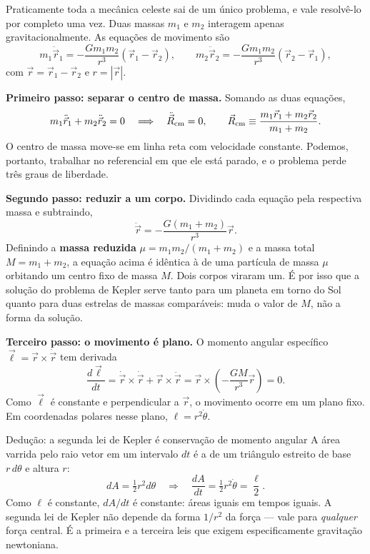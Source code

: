 \documentclass[11pt,a4paper]{article}
\begin{document}
Praticamente toda a mecânica celeste sai de um único problema, e vale resolvê-lo por completo uma vez. Duas massas $m_1$ e $m_2$ interagem apenas gravitacionalmente. As equações de movimento são
\[
m_1\ddot{\vec{r}}_1=-\frac{Gm_1m_2}{r^{3}}(\vec{r}_1-\vec{r}_2),
\qquad
m_2\ddot{\vec{r}}_2=-\frac{Gm_1m_2}{r^{3}}(\vec{r}_2-\vec{r}_1),
\]
com $\vec{r}=\vec{r}_1-\vec{r}_2$ e $r=|\vec{r}|$.

\textbf{Primeiro passo: separar o centro de massa.} Somando as duas equações,
\[
m_1\ddot{\vec{r}}_1+m_2\ddot{\vec{r}}_2=0
\quad\Longrightarrow\quad
\ddot{\vec{R}}_{\rm cm}=0,
\qquad
\vec{R}_{\rm cm}\equiv\frac{m_1\vec{r}_1+m_2\vec{r}_2}{m_1+m_2}.
\]
O centro de massa move-se em linha reta com velocidade constante. Podemos, portanto, trabalhar no referencial em que ele está parado, e o problema perde três graus de liberdade.

\textbf{Segundo passo: reduzir a um corpo.} Dividindo cada equação pela respectiva massa e subtraindo,
\[
\ddot{\vec{r}}=-\frac{G(m_1+m_2)}{r^{3}}\vec{r}.
\]
Definindo a \textbf{massa reduzida} $\mu=m_1m_2/(m_1+m_2)$ e a massa total $M=m_1+m_2$, a equação acima é idêntica à de uma partícula de massa $\mu$ orbitando um centro fixo de massa $M$. Dois corpos viraram um. É por isso que a solução do problema de Kepler serve tanto para um planeta em torno do Sol quanto para duas estrelas de massas comparáveis: muda o valor de $M$, não a forma da solução.

\textbf{Terceiro passo: o movimento é plano.} O momento angular específico $\vec{\ell}=\vec{r}\times\dot{\vec{r}}$ tem derivada
\[
\frac{d\vec{\ell}}{dt}=\dot{\vec{r}}\times\dot{\vec{r}}+\vec{r}\times\ddot{\vec{r}}
=\vec{r}\times\left(-\frac{GM}{r^{3}}\vec{r}\right)=0.
\]
Como $\vec{\ell}$ é constante e perpendicular a $\vec{r}$, o movimento ocorre em um plano fixo. Em coordenadas polares nesse plano, $\ell=r^{2}\dot{\theta}$.

\begin{lessonblock}[borderline west={2pt}{0pt}{astroGold}]{Dedução: a segunda lei de Kepler é conservação de momento angular}
A área varrida pelo raio vetor em um intervalo $dt$ é a de um triângulo estreito de base $r\,d\theta$ e altura $r$:
\[
dA=\tfrac{1}{2}r^{2}d\theta
\quad\Longrightarrow\quad
\frac{dA}{dt}=\tfrac{1}{2}r^{2}\dot{\theta}=\frac{\ell}{2}.
\]
Como $\ell$ é constante, $dA/dt$ é constante: áreas iguais em tempos iguais. A segunda lei de Kepler não depende da forma $1/r^2$ da força --- vale para \emph{qualquer} força central. É a primeira e a terceira leis que exigem especificamente gravitação newtoniana.
\end{lessonblock}
\end{document}

